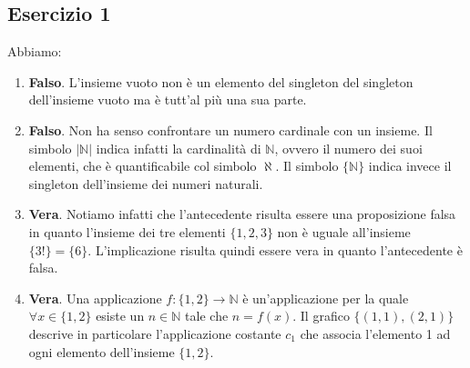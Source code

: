 \subsection*{Esercizio 1}
Abbiamo:
\begin{enumerate}[label=(\textit{\roman*})]
	\item \textbf{Falso}. L'insieme vuoto non è un elemento del singleton del singleton dell'insieme vuoto ma è tutt'al più una sua parte.
	\item \textbf{Falso}. Non ha senso confrontare un numero cardinale con un insieme. Il simbolo $|\mathbb{N}|$ indica infatti la cardinalità di $\mathbb{N}$, ovvero il numero dei suoi elementi, che è quantificabile col simbolo $\aleph$. Il simbolo $\{\mathbb{N}\}$ indica invece il singleton dell'insieme dei numeri naturali.
	\item \textbf{Vera}. Notiamo infatti che l'antecedente risulta essere una proposizione falsa in quanto l'insieme dei tre elementi $\{1,2,3\}$ non è uguale all'insieme $\{3!\}=\{6\}$. L'implicazione risulta quindi essere vera in quanto l'antecedente è falsa.
	\item \textbf{Vera}. Una applicazione $f: \{1,2\} \rightarrow \mathbb{N}$ è un'applicazione per la quale $\forall x \in \{1,2\}$  esiste un $n \in \mathbb{N}$ tale che $n=f(x)$. Il grafico $\{(1,1),(2,1)\}$ descrive in particolare l'applicazione costante $c_{1}$ che associa l'elemento 1 ad ogni elemento dell'insieme $\{1,2\}$.
\end{enumerate}

